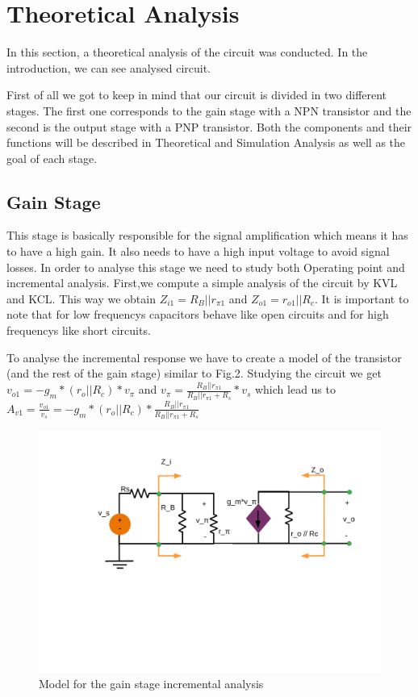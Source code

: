 \section{Theoretical Analysis} \label{section:theo}


\par In this section, a theoretical analysis of the circuit was conducted. In the introduction, we can see analysed circuit.

First of all we got to keep in mind that our circuit is divided in two different stages. The first one corresponds to the gain stage with a NPN transistor and the second is the output stage with a PNP transistor. Both the components and their functions will be described in Theoretical and Simulation Analysis as well as the goal of each stage.

\subsection{Gain Stage}
This stage is basically responsible for the signal amplification which means it has to have a high gain. It also needs to have a high input voltage to avoid signal losses. In order to analyse this stage we need to study both Operating point and incremental analysis.
First,we compute a simple analysis of the circuit by KVL and KCL. This way we obtain $Z_{i1}=R_B||r_{\pi 1}$ and $Z_{o1}=r_{o1}||R_c$. It is important to note that for low frequencys capacitors behave like open circuits and for high frequencys like short circuits.

To analyse the incremental response we have to create a model of the transistor (and the rest of the gain stage) similar to Fig.2. Studying the circuit we get $v_{o1}=-g_m * (r_o||R_c) * v_{\pi}$ and $v_{\pi}= \frac{R_B||r_{\pi 1}}{R_B||r_{\pi 1}+R_s} * v_s $ which lead us to $A_{v1} = \frac{v_{o1}}{v_s} = -g_m * (r_o||R_c)*\frac{R_B||r_{\pi 1}}{R_B||r_{\pi 1}+R_s}$


\begin{figure}[h] \centering
\includegraphics[width=0.65\linewidth]{Incremental_Gain.pdf}
\caption{Model for the gain stage incremental analysis}
\label{sdf}
\end{figure}

